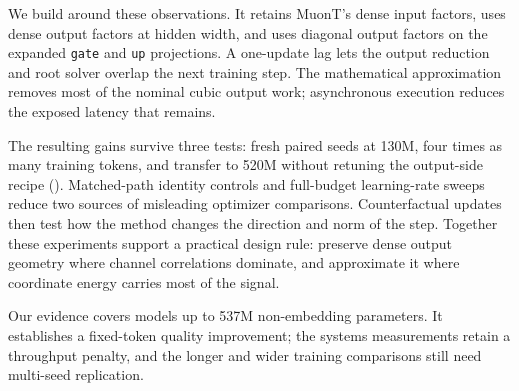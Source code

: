 We build  around these observations. It retains MuonT's dense input factors, uses dense output factors at hidden width, and uses diagonal output factors on the expanded \texttt{gate} and \texttt{up} projections. A one-update lag lets the output reduction and root solver overlap the next training step. The mathematical approximation removes most of the nominal cubic output work; asynchronous execution reduces the exposed latency that remains.

The resulting gains survive three tests: fresh paired seeds at 130M, four times as many training tokens, and transfer to 520M without retuning the output-side recipe (). Matched-path identity controls and full-budget learning-rate sweeps reduce two sources of misleading optimizer comparisons. Counterfactual updates then test how the method changes the direction and norm of the step. Together these experiments support a practical design rule: preserve dense output geometry where channel correlations dominate, and approximate it where coordinate energy carries most of the signal.

Our evidence covers models up to 537M non-embedding parameters. It establishes a fixed-token quality improvement; the systems measurements retain a throughput penalty, and the longer and wider training comparisons still need multi-seed replication.
